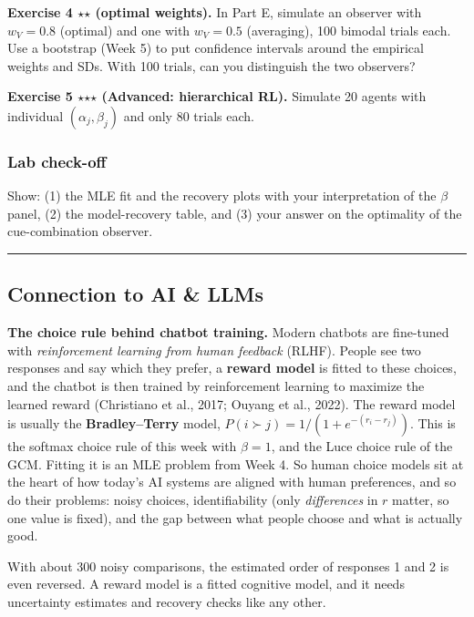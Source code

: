 \textbf{Exercise 4 \ensuremath{\star}\ensuremath{\star} (optimal weights).} In Part E, simulate an
observer with \(w_V = 0.8\) (optimal) and one with \(w_V = 0.5\)
(averaging), 100 bimodal trials each. Use a bootstrap (Week 5) to put
confidence intervals around the empirical weights and SDs. With 100
trials, can you distinguish the two observers?

\textbf{Exercise 5 \ensuremath{\star}\ensuremath{\star}\ensuremath{\star} (Advanced: hierarchical RL).} Simulate 20 agents
with individual \((\alpha_j, \beta_j)\) and only 80 trials each.

\subsubsection{Lab check-off}

Show: (1) the MLE fit and the recovery plots with your interpretation of
the \(\beta\) panel, (2) the model-recovery table, and (3) your answer
on the optimality of the cue-combination observer.

\begin{center}\rule{0.5\linewidth}{0.5pt}\end{center}

\subsection{Connection to AI \& LLMs}

\textbf{The choice rule behind chatbot training.} Modern chatbots are
fine-tuned with \emph{reinforcement learning from human feedback}
(RLHF). People see two responses and say which they prefer, a
\textbf{reward model} is fitted to these choices, and the chatbot is
then trained by reinforcement learning to maximize the learned reward
(Christiano et al., 2017; Ouyang et al., 2022). The reward model is
usually the \textbf{Bradley--Terry} model,
\(P(i \succ j) = 1/(1 + e^{-(r_i - r_j)})\). This is the softmax choice
rule of this week with \(\beta = 1\), and the Luce choice rule of the
GCM. Fitting it is an MLE problem from Week 4. So human choice models
sit at the heart of how today's AI systems are aligned with human
preferences, and so do their problems: noisy choices, identifiability
(only \emph{differences} in \(r\) matter, so one value is fixed), and
the gap between what people choose and what is actually good.

With about 300 noisy comparisons, the estimated order of responses 1 and
2 is even reversed. A reward model is a fitted cognitive model, and it
needs uncertainty estimates and recovery checks like any other.

